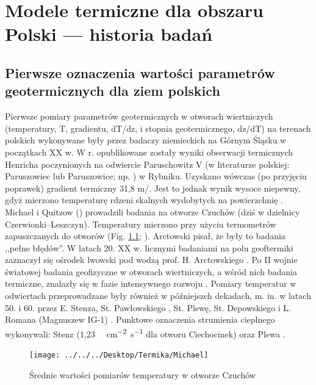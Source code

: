 \documentclass[11.5pt,twoside]{report}
\newcommand{\ct}[1]{\ignorespaces} %
\begin{document}

\chapter{Modele termiczne dla obszaru Polski --- historia badań}

\section{Pierwsze oznaczenia wartości parametrów geotermicznych dla ziem polskich}

Pierwsze pomiary parametrów geotermicznych w otworach wiertniczych (temperatury, T, gradientu, dT/dz, i stopnia geotermicznego, dz/dT) na terenach polskich wykonywane były przez badaczy niemieckich na Górnym Śląsku w początkach XX w. W \citeyear{Henrich.1904} r. opublikowane zostały wyniki obserwacji termicznych Henricha poczynionych na odwiercie Paruschowitz V (w literaturze polskiej: Paruszowiec lub Paruszowice; np. \cite{Plewa.1966,Stenz.1936}) w Rybniku. Uzyskano wówczas (po przyjęciu poprawek) gradient termiczny 31,8 m/{\textcelsius}. Jest to jednak wynik wysoce niepewny, gdyż mierzono temperaturę rdzeni skalnych wydobytych na powierzchnię \parencite{Maj.2010,Rudzki.1909,Henrich.1904}. Michael i Quitzow (\citeyear{Michael.1910}) prowadzili badania na otworze Czuchów (dziś w dzielnicy Czerwionki--Leszczyn). Temperatury mierzono przy użyciu termometrów zapuszczanych do otworów (Fig. \ref{michael}; \cite{Michael.1910}). Arctowski \parencite{Arctowski.1923a} pisał, że były to badania ,,pełne błędów''. W latach 20. XX w. licznymi badaniami na polu geoftermiki zaznaczył się ośrodek lwowski pod wodzą prof. H. Arctowskiego \parencite{Plewa.1966,Maj.2010}. Po II wojnie światowej badania geofizyczne w otworach wiertniczych, a wśród nich badania termiczne, znalazły się w fazie intensywnego rozwoju \parencite{Plewa.1994}. Pomiary temperatur w odwiertach przeprowadzane były również w pó\'{z}niejszch dekadach, m. in. w latach 50. i 60. przez E. Stenza, St. Pawłowskiego \ct{(Łeba)}, St. Plewę, St. Depowskiego i L. Romana (Magnuszew IG-1) \parencite{Plewa.1966,Roman.1962,Stenz.1936}. \ct{dopisac gdzie były badania} Punktowe oznaczenia strumienia cieplnego wykonywali: Stenz \ct{\citeyear{Stenz.1954}} (1,23 \si[sticky-per]{\micro\calorie.cm^{-2}.s^{-1}} dla otworu Ciechocinek) oraz Plewa \ct{parencite{Plewa.1961,Plewa.1963a,Plewa.1963b,Plewa.1965,Plewa.1966}}. 

\begin{figure}[h]
	\centering
	\texttt{[image: ../../../Desktop/Termika/Michael]}
	\caption{Średnie wartości pomiarów temperatury w otworze Czuchów \parencite{Michael.1910}}
	\label{michael}
\end{figure}
\end{document}
